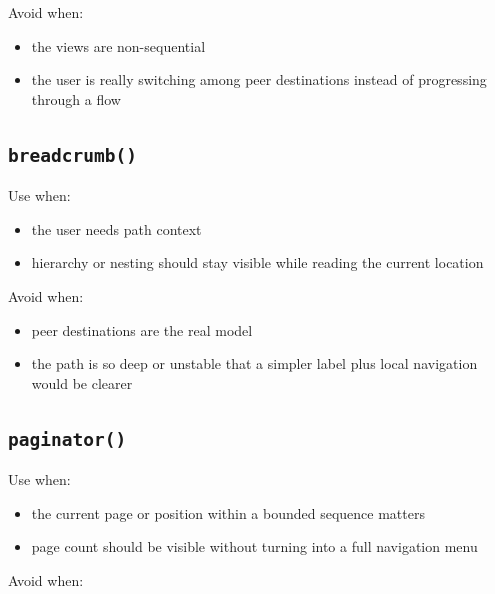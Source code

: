 Avoid when:

\begin{itemize}
\tightlist
\item
  the views are non-sequential
\item
  the user is really switching among peer destinations instead of progressing through a flow
\end{itemize}

\subsection{\texorpdfstring{\texttt{b\allowbreak{}r\allowbreak{}e\allowbreak{}a\allowbreak{}d\allowbreak{}c\allowbreak{}r\allowbreak{}u\allowbreak{}m\allowbreak{}b\allowbreak{}(\allowbreak{})}}{}}\label{record-023-breadcrumb}

Use when:

\begin{itemize}
\tightlist
\item
  the user needs path context
\item
  hierarchy or nesting should stay visible while reading the current location
\end{itemize}

Avoid when:

\begin{itemize}
\tightlist
\item
  peer destinations are the real model
\item
  the path is so deep or unstable that a simpler label plus local navigation would be clearer
\end{itemize}

\subsection{\texorpdfstring{\texttt{p\allowbreak{}a\allowbreak{}g\allowbreak{}i\allowbreak{}n\allowbreak{}a\allowbreak{}t\allowbreak{}o\allowbreak{}r\allowbreak{}(\allowbreak{})}}{}}\label{record-023-paginator}

Use when:

\begin{itemize}
\tightlist
\item
  the current page or position within a bounded sequence matters
\item
  page count should be visible without turning into a full navigation menu
\end{itemize}

Avoid when:

